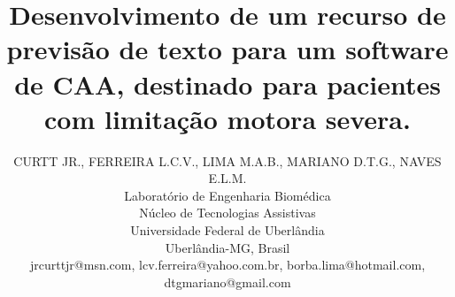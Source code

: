 \documentclass[twoside]{article}
\title{\vspace{-15mm}\fontsize{24pt}{10pt}\selectfont\textbf{Desenvolvimento de um recurso de previsão de texto para um software de CAA, destinado para pacientes com limitação motora severa.}} %
\author{
\large
\textsc{CURTT JR., FERREIRA L.C.V., LIMA M.A.B., MARIANO D.T.G., NAVES E.L.M.}\\[2mm] %
\normalsize Laboratório de Engenharia Biomédica\\\normalsize Núcleo de Tecnologias Assistivas\\\normalsize Universidade Federal de Uberlândia\\ \normalsize Uberlândia-MG, Brasil \\ %
\normalsize {jrcurttjr@msn.com, lcv.ferreira@yahoo.com.br, borba.lima@hotmail.com, dtgmariano@gmail.com} %
\vspace{-5mm}
}
\date{}
\begin{document}
\maketitle %

\thispagestyle{fancy} %



\begin{abstract}
\noindent

\end{abstract}

\end{document}
